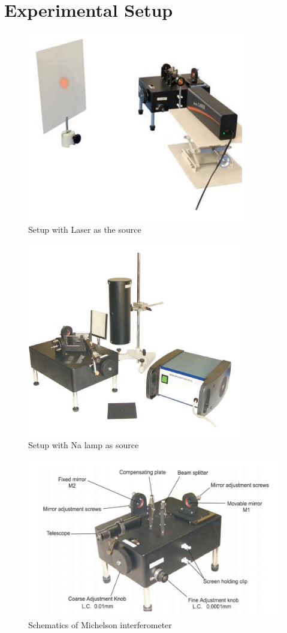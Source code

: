 \documentclass{article}
\begin{document}
\section{Experimental Setup}
\begin{figure}[h!]
    \centering
    \includegraphics[scale = 0.8]{Figures/laser setup.png}
    \caption{Setup with Laser as the source}
    \label{fig:laser_setup}
\end{figure}
\begin{figure}[h!]
    \centering
    \includegraphics[scale = 1]{Figures/nalamp setup.png}
    \caption{Setup with Na lamp as source}
    \label{fig:lamp_setup}
\end{figure}
\begin{figure}[h!]
    \centering
    \includegraphics[scale = 0.90]{Figures/schematics.png}
    \caption{Schematics of Michelson interferometer}
    \label{fig:schematics}
\end{figure}
\end{document}
